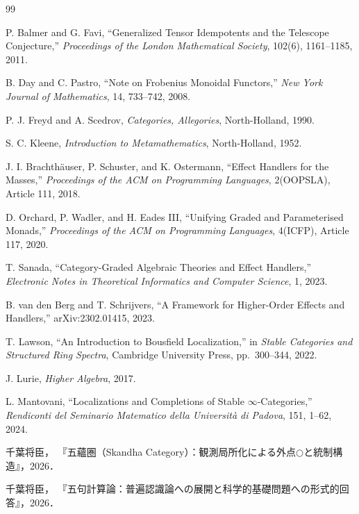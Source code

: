 \documentclass[11pt,a4paper]{ltjsarticle}
\theoremstyle{definition}
\theoremstyle{remark}
\begin{document}
\begin{thebibliography}{99}

P. Balmer and G. Favi,
``Generalized Tensor Idempotents and the Telescope Conjecture,''
\textit{Proceedings of the London Mathematical Society},
102(6), 1161--1185, 2011.

B. Day and C. Pastro,
``Note on Frobenius Monoidal Functors,''
\textit{New York Journal of Mathematics}, 14, 733--742, 2008.

P. J. Freyd and A. Scedrov,
\textit{Categories, Allegories}, North-Holland, 1990.

S. C. Kleene,
\textit{Introduction to Metamathematics}, North-Holland, 1952.

J. I. Brachthäuser, P. Schuster, and K. Ostermann,
``Effect Handlers for the Masses,''
\textit{Proceedings of the ACM on Programming Languages},
2(OOPSLA), Article 111, 2018.

D. Orchard, P. Wadler, and H. Eades III,
``Unifying Graded and Parameterised Monads,''
\textit{Proceedings of the ACM on Programming Languages},
4(ICFP), Article 117, 2020.

T. Sanada,
``Category-Graded Algebraic Theories and Effect Handlers,''
\textit{Electronic Notes in Theoretical Informatics and Computer Science},
1, 2023.

B. van den Berg and T. Schrijvers,
``A Framework for Higher-Order Effects and Handlers,''
arXiv:2302.01415, 2023.

T. Lawson,
``An Introduction to Bousfield Localization,'' in
\textit{Stable Categories and Structured Ring Spectra},
Cambridge University Press, pp.~300--344, 2022.

J. Lurie,
\textit{Higher Algebra}, 2017.

L. Mantovani,
``Localizations and Completions of Stable $\infty$-Categories,''
\textit{Rendiconti del Seminario Matematico della Università di Padova},
151, 1--62, 2024.

千葉将臣，
『五蘊圏（Skandha Category）：観測局所化による外点$\bigcirc$と統制構造』，2026．

千葉将臣，
『五句計算論：普遍認識論への展開と科学的基礎問題への形式的回答』，2026．

\end{thebibliography}
\end{document}
